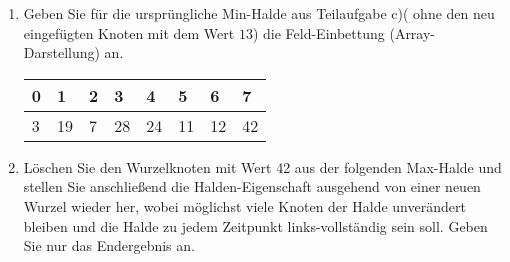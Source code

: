 \documentclass{bschlangaul-aufgabe}
\begin{document}
\begin{enumerate}
\begin{bAntwort}
\begin{bBaum}{Nach dem Vertauschen von „13“ und „28“}

\end{bBaum}

\begin{bBaum}{Nach dem Vertauschen von „13“ und „19“}

\end{bBaum}
\end{bAntwort}


\item Geben Sie für die ursprüngliche Min-Halde aus Teilaufgabe c)(\dh
ohne den neu eingefügten Knoten mit dem Wert $13$) die Feld-Einbettung
(Array-Darstellung) an.

\begin{bAntwort}
\begin{tabular}{llllllll}
\bf{0} & \bf{1} & \bf{2} & \bf{3} & \bf{4} & \bf{5} & \bf{6} & \bf{7} \\
\hline
3      & 19     & 7      & 28     & 24     & 11     & 12     & 42     \\
\end{tabular}
\end{bAntwort}


\item Löschen Sie den Wurzelknoten mit Wert 42 aus der folgenden
Max-Halde und stellen Sie anschließend die Halden-Eigenschaft ausgehend
von einer neuen Wurzel wieder her, wobei möglichst viele Knoten der
Halde unverändert bleiben und die Halde zu jedem Zeitpunkt
links-vollständig sein soll. Geben Sie nur das Endergebnis an.

\begin{center}
\end{center}


\end{enumerate}
\end{document}
